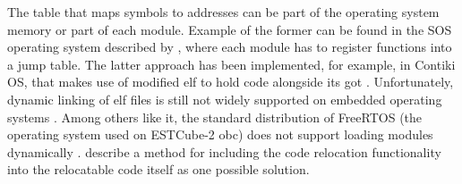 The table that maps symbols to addresses can be part of the operating system memory or part of each module. Example of the former can be found in the SOS operating system described by \textcite{Han2005}, where each module has to register functions into a jump table. The latter approach has been implemented, for example, in Contiki OS, that makes use of modified \gls{elf} to hold code alongside its \gls{got} \cite{Dunkels2006}. Unfortunately, dynamic linking of \gls{elf} files is still not widely supported on embedded operating systems \cite{Xinyu2017}. Among others like it, the standard distribution of FreeRTOS (the operating system used on ESTCube-2 \gls{obc}) does not support loading modules dynamically \cite{Barry2005}. \textcite{Xinyu2017} describe a method for including the code relocation functionality into the relocatable code itself as one possible solution.

